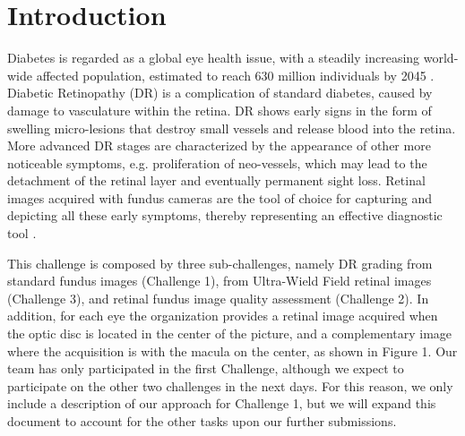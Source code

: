 \section{Introduction}
Diabetes is regarded as a global eye health issue, with a steadily increasing world-wide affected population, estimated to reach 630 million individuals by 2045 \cite{noauthor_who_nodate}. Diabetic Retinopathy (DR) is a complication of standard diabetes, caused by damage to vasculature within the retina. DR shows early signs in the form of swelling micro-lesions that destroy small vessels and release blood into the retina. More advanced DR stages are characterized by the appearance of other more noticeable symptoms, e.g. proliferation of neo-vessels, which may lead to the detachment of the retinal layer and eventually
permanent sight loss. Retinal images acquired with fundus cameras are the tool of choice for capturing and depicting all these early symptoms, thereby representing an effective diagnostic tool \cite{fenner_advances_2018}. 

This challenge is composed by three sub-challenges, namely DR grading from standard fundus images (Challenge 1), from Ultra-Wield Field retinal images (Challenge 3), and retinal fundus image quality assessment (Challenge 2). In addition, for each eye the organization provides a retinal image acquired when the optic disc is located in the center of the picture, and a complementary image where the acquisition is with the macula on the center, as shown in Figure 1. Our team has only participated in the first Challenge, although we expect to participate on the other two challenges in the next days. For this reason, we only include a description of our approach for Challenge 1, but we will expand this document to account for the other tasks upon our further submissions.
